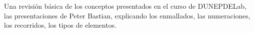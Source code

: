 Una revisión básica de los conceptos presentados en el curso de 
DUNEPDELab, las presentaciones de Peter Bastian, explicando los 
enmallados, las numeraciones, los recorridos, los tipos de elementos.
